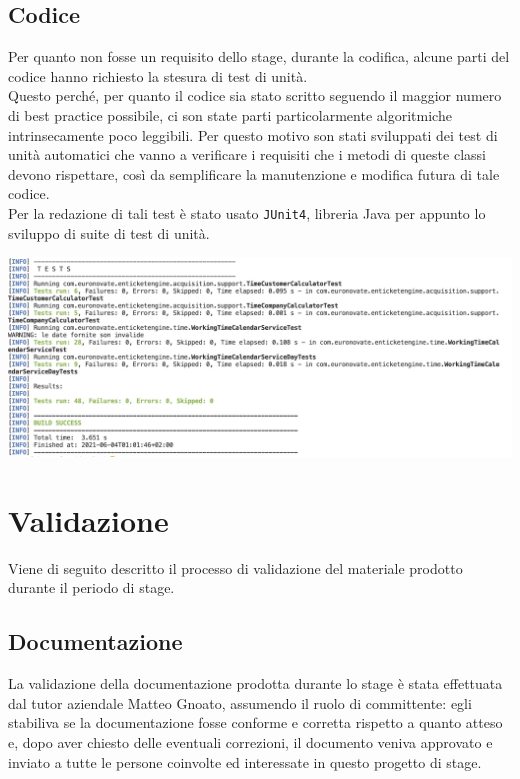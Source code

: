 		\subsection{Codice}
			Per quanto non fosse un requisito dello stage, durante la codifica, alcune parti del codice hanno richiesto la stesura di test di unità. \\
			Questo perché, per quanto il codice sia stato scritto seguendo il maggior numero di best practice possibile, ci son state parti particolarmente algoritmiche intrinsecamente poco leggibili. Per questo motivo son stati sviluppati dei test di unità automatici che vanno a verificare i requisiti che i metodi di queste classi devono rispettare, così da semplificare la manutenzione e modifica futura di tale codice. \\
			Per la redazione di tali test è stato usato \texttt{JUnit4}, libreria Java per appunto lo sviluppo di suite di test di unità.
			\begin{center}
				\includegraphics[keepaspectratio = true, width=16cm]{immagini/test.png}
			\end{center}
	\section{Validazione}
		Viene di seguito descritto il processo di validazione del materiale prodotto durante il periodo di stage.
		\subsection{Documentazione}
			La validazione  della documentazione prodotta durante lo stage è stata effettuata dal tutor aziendale Matteo Gnoato, assumendo il ruolo di committente: egli stabiliva se la documentazione fosse conforme e corretta rispetto a quanto atteso e, dopo aver chiesto delle eventuali correzioni, il documento veniva approvato e inviato a tutte le persone coinvolte ed interessate in questo progetto di stage.
